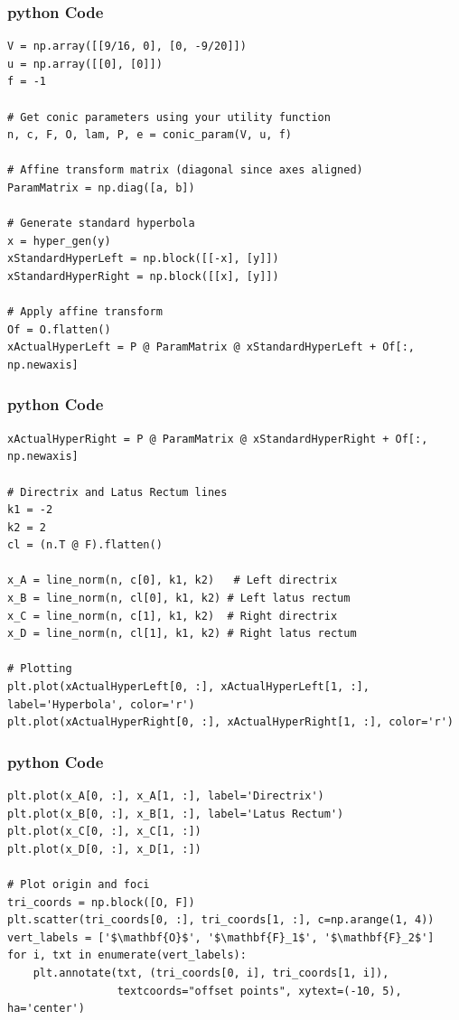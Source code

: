 \documentclass{beamer}
\begin{document}
\begin{frame}[fragile]
    \frametitle{python Code }
    \begin{lstlisting}
V = np.array([[9/16, 0], [0, -9/20]])
u = np.array([[0], [0]])
f = -1

# Get conic parameters using your utility function
n, c, F, O, lam, P, e = conic_param(V, u, f)

# Affine transform matrix (diagonal since axes aligned)
ParamMatrix = np.diag([a, b])

# Generate standard hyperbola
x = hyper_gen(y)
xStandardHyperLeft = np.block([[-x], [y]])
xStandardHyperRight = np.block([[x], [y]])

# Apply affine transform
Of = O.flatten()
xActualHyperLeft = P @ ParamMatrix @ xStandardHyperLeft + Of[:, np.newaxis]
    \end{lstlisting}
\end{frame}
\begin{frame}[fragile]
    \frametitle{python Code }
    \begin{lstlisting}
xActualHyperRight = P @ ParamMatrix @ xStandardHyperRight + Of[:, np.newaxis]

# Directrix and Latus Rectum lines
k1 = -2
k2 = 2
cl = (n.T @ F).flatten()

x_A = line_norm(n, c[0], k1, k2)   # Left directrix
x_B = line_norm(n, cl[0], k1, k2) # Left latus rectum
x_C = line_norm(n, c[1], k1, k2)  # Right directrix
x_D = line_norm(n, cl[1], k1, k2) # Right latus rectum

# Plotting
plt.plot(xActualHyperLeft[0, :], xActualHyperLeft[1, :], label='Hyperbola', color='r')
plt.plot(xActualHyperRight[0, :], xActualHyperRight[1, :], color='r')
     \end{lstlisting}
\end{frame}
\begin{frame}[fragile]
    \frametitle{python Code }
    \begin{lstlisting}
plt.plot(x_A[0, :], x_A[1, :], label='Directrix')
plt.plot(x_B[0, :], x_B[1, :], label='Latus Rectum')
plt.plot(x_C[0, :], x_C[1, :])
plt.plot(x_D[0, :], x_D[1, :])

# Plot origin and foci
tri_coords = np.block([O, F])
plt.scatter(tri_coords[0, :], tri_coords[1, :], c=np.arange(1, 4))
vert_labels = ['$\mathbf{O}$', '$\mathbf{F}_1$', '$\mathbf{F}_2$']
for i, txt in enumerate(vert_labels):
    plt.annotate(txt, (tri_coords[0, i], tri_coords[1, i]), 
                 textcoords="offset points", xytext=(-10, 5), ha='center')
    \end{lstlisting}
\end{frame}
\end{document}

